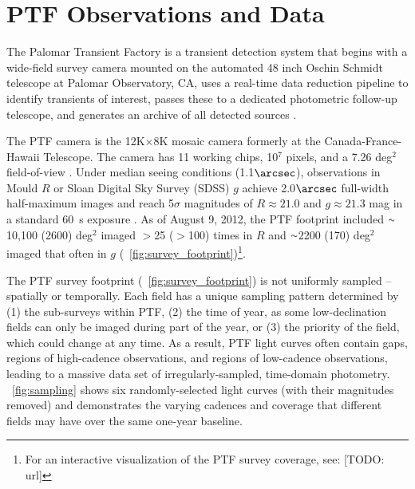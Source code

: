\documentclass[12pt,preprint]{aastex}
\newcommand{\apwsim}{\raisebox{0.2ex}{\scriptsize$\sim$\normalsize}}
\begin{document}
\section{PTF Observations and Data}
The Palomar Transient Factory is a transient detection system that begins with a wide-field survey camera mounted on the automated 48 inch Oschin Schmidt telescope at Palomar Observatory, CA, uses a real-time data reduction pipeline to identify transients of interest, passes these to a dedicated photometric follow-up telescope, and generates an archive of all detected sources \citep{nick2009,rau2009}.

The PTF camera is the 12K$\times$8K mosaic camera formerly at the Canada-France-Hawaii Telescope. The camera has 11 working chips, 10$^7$ pixels, and a 7.26 deg$^2$ field-of-view \citep{rahmer2008}. Under median seeing conditions (1.1$\arcsec$), observations in Mould $R$ or Sloan Digital Sky Survey (SDSS) $g$ achieve 2.0$\arcsec$ full-width half-maximum images and reach 5$\sigma$ magnitudes of $R \approx 21.0$ and $g \approx 21.3$ mag in a standard 60~s exposure \citep{nick2010}. As of August 9, 2012, the PTF footprint included $\apwsim$10,100 (2600) deg$^2$ imaged $>$25 ($>$100) times in $R$ and $\apwsim$2200 (170) deg$^2$ imaged that often in $g$ (\figurename~\ref{fig:survey_footprint})\footnote{For an interactive visualization of the PTF survey coverage, see: [TODO: url]}.

The PTF survey footprint (\figurename~\ref{fig:survey_footprint}) is not uniformly sampled -- spatially or temporally. Each field has a unique sampling pattern determined by (1) the sub-surveys within PTF, (2) the time of year, as some low-declination fields can only be imaged during part of the year, or (3) the priority of the field, which could  change at any time. As a result, PTF light curves often contain gaps, regions of high-cadence observations, and regions of low-cadence observations, leading to a massive data set of irregularly-sampled, time-domain photometry. \figurename~\ref{fig:sampling} shows six randomly-selected light curves (with their magnitudes removed) and demonstrates the varying cadences and coverage that different fields may have over the same one-year baseline.
\end{document}
